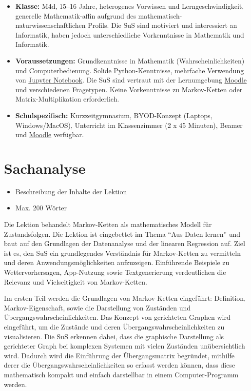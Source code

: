 \begin{itemize}
    \item \textbf{Klasse:} M4d, 15--16 Jahre, heterogenes Vorwissen und Lerngeschwindigkeit, generelle Mathematik-affin aufgrund des mathematisch-naturwissenschaftlichen Profils. Die SuS sind motiviert und interessiert an Informatik, haben jedoch unterschiedliche Vorkenntnisse in Mathematik und Informatik.
    \item \textbf{Voraussetzungen:} Grundkenntnisse in Mathematik (Wahrscheinlichkeiten) und Computerbedienung. Solide Python-Kenntnisse, mehrfache Verwendung von \href{https://cyrilblum.github.io/datascience-jupyter/lab/index.html}{Jupyter Notebook}. Die SuS sind vertraut mit der Lernumgebung \href{https://moodle.kzn.ch}{Moodle} und verschiedenen Fragetypen. Keine Vorkenntnisse zu Markov-Ketten oder Matrix-Multiplikation erforderlich.
    \item \textbf{Schulspezifisch:} Kurzzeitgymnasium, BYOD-Konzept (Laptops, Windows/MacOS), Unterricht im Klassenzimmer (2 x 45 Minuten), Beamer und \href{https://moodle.kzn.ch}{Moodle} verfügbar.
\end{itemize}

\section*{Sachanalyse}
\begin{tcolorbox}[colback=gray!10, colframe=gray!80!black, title=Anforderungen]
    \begin{itemize}
        \item Beschreibung der Inhalte der Lektion
        \item Max. 200 Wörter
    \end{itemize}
\end{tcolorbox}

Die Lektion behandelt Markov-Ketten als mathematisches Modell für Zustandsfolgen. Die Lektion ist eingebettet im Thema \enquote{Aus Daten lernen} und baut auf den Grundlagen der Datenanalyse und der linearen Regression auf. Ziel ist es, den SuS ein grundlegendes Verständnis für Markov-Ketten zu vermitteln und deren Anwendungsmöglichkeiten aufzuzeigen. Einführende Beispiele zu Wettervorhersagen, App-Nutzung sowie Textgenerierung verdeutlichen die Relevanz und Vielseitigkeit von Markov-Ketten. 

Im ersten Teil werden die Grundlagen von Markov-Ketten eingeführt: Definition, Markov-Eigenschaft, sowie die Darstellung von Zuständen und Übergangswahrscheinlichkeiten. Das Konzept von gerichteten Graphen wird eingeführt, um die Zustände und deren Übergangswahrscheinlichkeiten zu visualisieren. Die SuS erkennen dabei, dass die graphische Darstellung als gerichteter Graph bei komplexen Systemen mit vielen Zuständen unübersichtlich wird. Dadurch wird die Einführung der Übergangsmatrix begründet, mithilfe derer die Übergangswahrscheinlichkeiten so erfasst werden können, dass diese mathematisch kompakt und einfach darstellbar in einem Computer-Programm werden.

